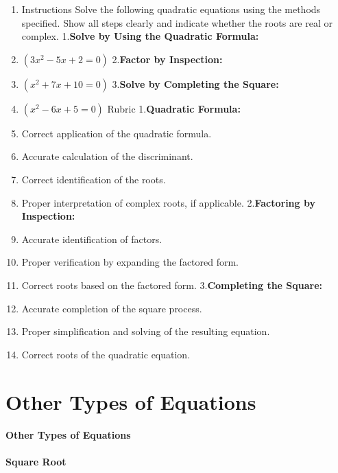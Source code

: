 \begin{enumerate}
    \item Instructions Solve the following quadratic equations using the methods specified. Show all steps clearly and indicate whether the roots are real or complex. 1.\textbf{Solve by Using the Quadratic Formula:}
    \item $( 3x^2 - 5x + 2 = 0 )$ 2.\textbf{Factor by Inspection:}
    \item $( x^2 + 7x + 10 = 0 )$ 3.\textbf{Solve by Completing the Square:}
    \item $( x^2 - 6x + 5 = 0 )$ Rubric 1.\textbf{Quadratic Formula:}
    \item Correct application of the quadratic formula.
    \item Accurate calculation of the discriminant.
    \item Correct identification of the roots.
    \item Proper interpretation of complex roots, if applicable. 2.\textbf{Factoring by Inspection:}
    \item Accurate identification of factors.
    \item Proper verification by expanding the factored form.
    \item Correct roots based on the factored form. 3.\textbf{Completing the Square:}
    \item Accurate completion of the square process.
    \item Proper simplification and solving of the resulting equation.
    \item Correct roots of the quadratic equation.
\end{enumerate}

\section{Other Types of Equations}
\label{sec:other-types-of-equations}

\paragraph{Other Types of Equations}

\paragraph{Square Root}

